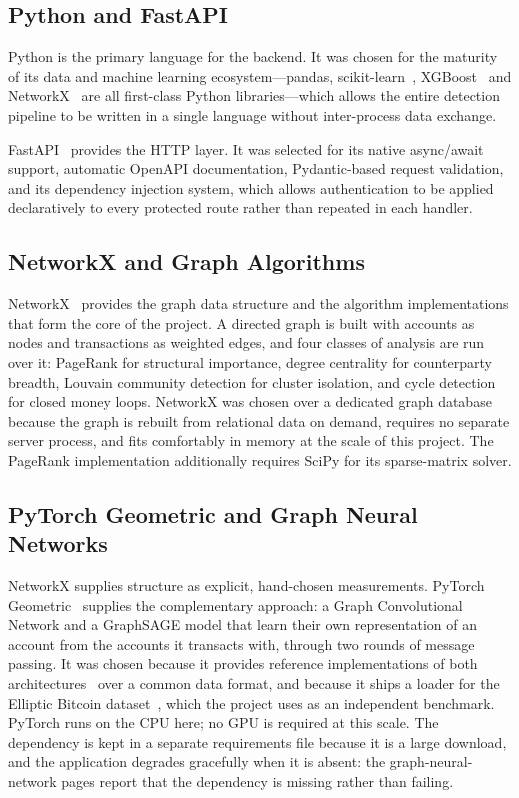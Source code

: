 \subsection{Python and FastAPI}
Python is the primary language for the backend. It was chosen for the maturity of its data and machine learning ecosystem---pandas, scikit-learn~\cite{pedregosa2011}, XGBoost~\cite{chen2016} and NetworkX~\cite{hagberg2008} are all first-class Python libraries---which allows the entire detection pipeline to be written in a single language without inter-process data exchange.

FastAPI~\cite{fastapi} provides the HTTP layer. It was selected for its native async/await support, automatic OpenAPI documentation, Pydantic-based request validation, and its dependency injection system, which allows authentication to be applied declaratively to every protected route rather than repeated in each handler.

\subsection{NetworkX and Graph Algorithms}
NetworkX~\cite{hagberg2008} provides the graph data structure and the algorithm implementations that form the core of the project. A directed graph is built with accounts as nodes and transactions as weighted edges, and four classes of analysis are run over it: PageRank for structural importance, degree centrality for counterparty breadth, Louvain community detection for cluster isolation, and cycle detection for closed money loops. NetworkX was chosen over a dedicated graph database because the graph is rebuilt from relational data on demand, requires no separate server process, and fits comfortably in memory at the scale of this project. The PageRank implementation additionally requires SciPy for its sparse-matrix solver.

\subsection{PyTorch Geometric and Graph Neural Networks}
NetworkX supplies structure as explicit, hand-chosen measurements. PyTorch Geometric~\cite{fey2019} supplies the complementary approach: a Graph Convolutional Network and a GraphSAGE model that learn their own representation of an account from the accounts it transacts with, through two rounds of message passing. It was chosen because it provides reference implementations of both architectures~\cite{kipf2017,hamilton2017} over a common data format, and because it ships a loader for the Elliptic Bitcoin dataset~\cite{weber2019}, which the project uses as an independent benchmark. PyTorch runs on the CPU here; no GPU is required at this scale. The dependency is kept in a separate requirements file because it is a large download, and the application degrades gracefully when it is absent: the graph-neural-network pages report that the dependency is missing rather than failing.

